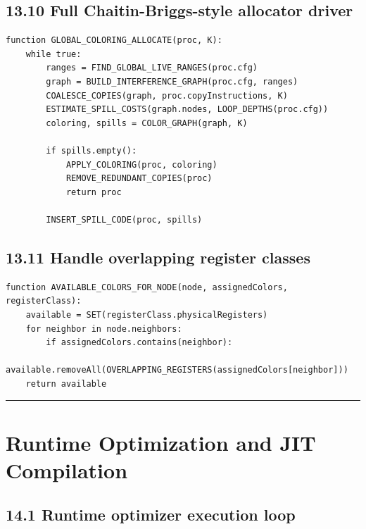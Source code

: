 \documentclass[10pt,letterpaper]{article}
\begin{document}
\subsection*{13.10 Full Chaitin-Briggs-style allocator driver}

\begin{verbatim}
function GLOBAL_COLORING_ALLOCATE(proc, K):
    while true:
        ranges = FIND_GLOBAL_LIVE_RANGES(proc.cfg)
        graph = BUILD_INTERFERENCE_GRAPH(proc.cfg, ranges)
        COALESCE_COPIES(graph, proc.copyInstructions, K)
        ESTIMATE_SPILL_COSTS(graph.nodes, LOOP_DEPTHS(proc.cfg))
        coloring, spills = COLOR_GRAPH(graph, K)

        if spills.empty():
            APPLY_COLORING(proc, coloring)
            REMOVE_REDUNDANT_COPIES(proc)
            return proc

        INSERT_SPILL_CODE(proc, spills)
\end{verbatim}

\subsection*{13.11 Handle overlapping register classes}

\begin{verbatim}
function AVAILABLE_COLORS_FOR_NODE(node, assignedColors, registerClass):
    available = SET(registerClass.physicalRegisters)
    for neighbor in node.neighbors:
        if assignedColors.contains(neighbor):
            available.removeAll(OVERLAPPING_REGISTERS(assignedColors[neighbor]))
    return available
\end{verbatim}

\medskip\hrule\medskip

\clearpage
\section{Runtime Optimization and JIT Compilation}

\subsection*{14.1 Runtime optimizer execution loop}
\end{document}
